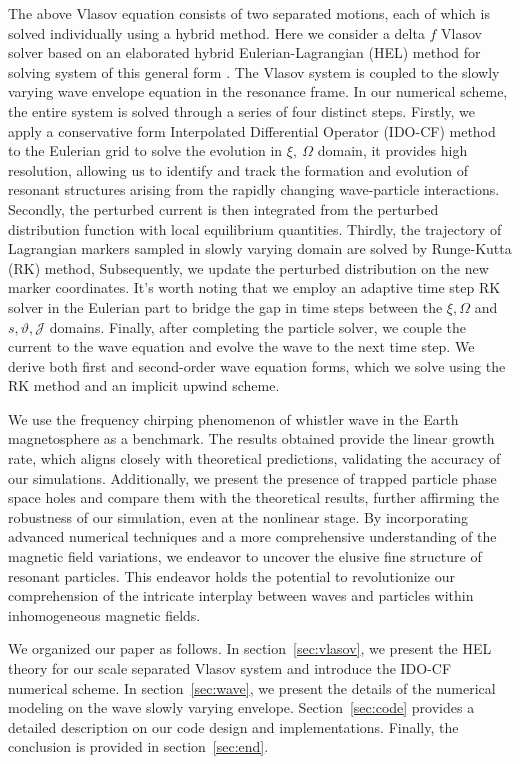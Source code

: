 The above Vlasov equation consists of two separated motions, each of which is solved individually using a hybrid method.
Here we consider a delta $f$ Vlasov solver based on an elaborated hybrid Eulerian-Lagrangian (HEL) method for solving system of this general form \cite{shiroto2022}.
The Vlasov system is coupled to the slowly varying wave envelope equation in the resonance frame. 
In our numerical scheme, the entire system is solved through a series of four distinct steps.
Firstly, we apply a conservative form Interpolated Differential Operator (IDO-CF)  method to the Eulerian grid to solve the evolution in $\xi,~\Omega$ domain, it provides high resolution, allowing us to identify and track the formation and evolution of resonant structures arising from the rapidly changing wave-particle interactions.
Secondly, the perturbed current is then integrated from the perturbed distribution function with local equilibrium quantities.
Thirdly, the trajectory of Lagrangian markers sampled in slowly varying domain are solved by Runge-Kutta (RK) method, 
Subsequently, we update the perturbed distribution on the new marker coordinates. It's worth noting that we employ an adaptive time step RK solver in the Eulerian part to bridge the gap in time steps between the $\xi, \Omega$ and $s, \vartheta, \mathcal{J}$ domains.
Finally, after completing the particle solver, we couple the current to the wave equation and evolve the wave to the next time step.
We derive both first and second-order wave equation forms, which we solve using the RK method and an implicit upwind scheme.

We use the frequency chirping phenomenon of whistler wave in the Earth magnetosphere as a benchmark.
The results obtained provide the linear growth rate, which aligns closely with theoretical predictions, validating the accuracy of our simulations.
Additionally, we present the presence of trapped particle phase space holes and compare them with the theoretical results, further affirming the robustness of our simulation, even at the nonlinear stage.
By incorporating advanced numerical techniques and a more comprehensive understanding of the magnetic field variations, we endeavor to uncover the elusive fine structure of resonant particles. This endeavor holds the potential to revolutionize our comprehension of the intricate interplay between waves and particles within inhomogeneous magnetic fields.

We organized our paper as follows. In section~\ref{sec:vlasov}, we present the HEL theory for our scale separated Vlasov system and introduce the IDO-CF numerical scheme. In section~\ref{sec:wave}, we present the details of the numerical modeling on the wave slowly varying envelope. Section~\ref{sec:code} provides a detailed description on our code design and implementations. Finally, the conclusion is provided in section~\ref{sec:end}.

